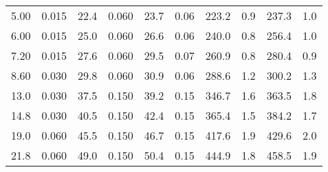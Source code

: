 \begin{tabular}{cccccccccc}
5.00       & 0.015           & 22.4        &    0.060       & 23.7          &    0.06                & 223.2         & 0.9            & 237.3         & 1.0                      \\                                                                  
6.00       & 0.015           & 25.0        &    0.060       & 26.6          &    0.06                & 240.0         & 0.8            & 256.4         & 1.0                      \\                                                                  
7.20       & 0.015           & 27.6        &    0.060       & 29.5          &    0.07                & 260.9         & 0.8            & 280.4         & 0.9                      \\                                                                  
8.60       & 0.030           & 29.8        &    0.060       & 30.9          &    0.06                & 288.6         & 1.2            & 300.2         & 1.3                      \\                                                                  
13.0       & 0.030           & 37.5        &    0.150       & 39.2          &    0.15                & 346.7         & 1.6            & 363.5         & 1.8                      \\                                                                  
14.8       & 0.030           & 40.5        &    0.150       & 42.4          &    0.15                & 365.4         & 1.5            & 384.2         & 1.7                      \\                                                                  
19.0       & 0.060           & 45.5        &    0.150       & 46.7          &    0.15                & 417.6         & 1.9            & 429.6         & 2.0                      \\                                                                  
21.8       & 0.060           & 49.0        &    0.150       & 50.4          &    0.15                & 444.9         & 1.8            & 458.5         & 1.9                      \\  \bottomrule                                                                  

\end{tabular}
